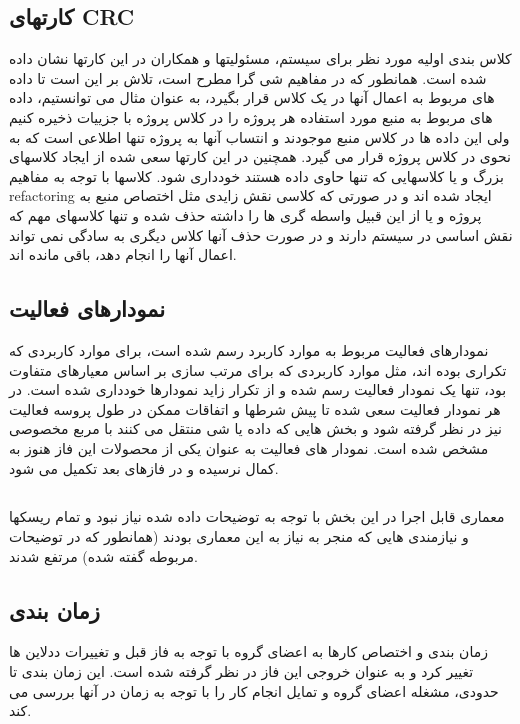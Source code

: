 \subsection*{کارتهای CRC}
کلاس بندی اولیه مورد نظر برای سیستم، مسئولیتها و همکاران در این کارتها نشان داده شده است. همانطور که در مفاهیم شی گرا مطرح است، تلاش بر این است تا داده های مربوط به اعمال آنها در یک کلاس قرار بگیرد، به عنوان مثال می توانستیم، داده های مربوط به منبع مورد استفاده هر پروژه را در کلاس پروژه با جزییات ذخیره کنیم ولی این داده ها در کلاس منبع موجودند و انتساب آنها به پروژه تنها اطلاعی است که به نحوی در کلاس پروژه قرار می گیرد. همچنین در این کارتها سعی شده از ایجاد کلاسهای بزرگ و یا کلاسهایی که تنها حاوی داده هستند خودداری شود. کلاسها با توجه به مفاهیم refactoring ایجاد شده اند و در صورتی که کلاسی نقش زایدی مثل اختصاص منبع به پروژه و یا از این قبیل واسطه گری ها را داشته حذف شده و تنها کلاسهای مهم که نقش اساسی در سیستم دارند و در صورت حذف آنها کلاس دیگری به سادگی نمی تواند اعمال آنها را انجام دهد، باقی مانده اند.
\subsection*{نمودارهای فعالیت}
نمودارهای فعالیت مربوط به موارد کاربرد رسم شده است، برای موارد کاربردی که تکراری بوده اند، مثل موارد کاربردی که برای مرتب سازی بر اساس معیارهای متفاوت بود، تنها یک نمودار فعالیت رسم شده و از تکرار زاید نمودارها خودداری شده است. در هر نمودار فعالیت سعی شده تا پیش شرطها و اتفاقات ممکن در طول پروسه فعالیت نیز در نظر گرفته شود و بخش هایی که داده یا شی منتقل می کنند با مربع مخصوصی مشخص شده است. نمودار های فعالیت به عنوان یکی از محصولات این فاز هنوز به کمال نرسیده و در فازهای بعد تکمیل می شود.
\subsection*{}
معماری قابل اجرا در این بخش با توجه به توضیحات داده شده نیاز نبود و تمام ریسکها و نیازمندی هایی که منجر به نیاز به این معماری بودند (همانطور که در توضیحات مربوطه گفته شده) مرتفع شدند.
\subsection*{زمان بندی}
زمان بندی و اختصاص کارها به اعضای گروه با توجه به فاز قبل و تغییرات ددلاین ها تغییر کرد و به عنوان خروجی این فاز در نظر گرفته شده است. این زمان بندی تا حدودی، مشغله اعضای گروه و تمایل انجام کار را با توجه به زمان در آنها بررسی می کند.



